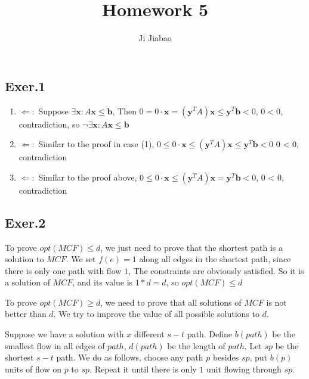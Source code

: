 \documentclass[UTF8]{ctexart}
\begin{document}
 

\title{Homework 5}
\author{Ji Jiabao}
\maketitle

\subsection*{Exer.1}
    \begin{enumerate}
        \item 
            $\Leftarrow:$ 
            Suppose $\exists \mathbf{x} : A\mathbf{x}\le\mathbf{b}$,
            Then $0 = 0 \cdot \mathbf{x}=(\mathbf{y}^TA)\mathbf{x} \le \mathbf{y}^T\mathbf{b} < 0$,
            $0 < 0$, contradiction, so $\neg \exists \mathbf{x} : A\mathbf{x}\le\mathbf{b}$
        \item 
            $\Leftarrow:$
            Similar to the proof in case (1), $0 \le 0 \cdot \mathbf{x} \le (\mathbf{y}^TA)\mathbf{x} \le \mathbf{y}^T\mathbf{b} < 0$
            0 < 0, contradiction
        \item 
            $\Leftarrow:$
            Similar to the proof above, $0 \le 0 \cdot \mathbf{x} \le (\mathbf{y}^TA)\mathbf{x} = \mathbf{y}^T\mathbf{b} < 0$,
            0 < 0, contradiction
    \end{enumerate}

\subsection*{Exer.2}
    To prove $opt(MCF) \le d$, we just need to prove that the shortest path is a solution to $MCF$.
    We set $f(e) = 1$ along all edges in the shortest path, since there is only one path with flow $1$,
    The constraints are obviously satisfied. So it is a solution of $MCF$, and its value is $1 * d = d$,
    so $opt(MCF) \le d$

    To prove $opt(MCF) \ge d$, we need to prove that all solutions of $MCF$ is not better than $d$.
    We try to improve the value of all possible solutions to $d$.
    
    Suppose we have a solution with $x$ different $s-t$ path. Define $b(path)$ be the smallest flow in all
    edges of $path$, $d(path)$ be the length of $path$. Let $sp$ be the shortest $s-t$ path. We do as follows, choose any path $p$ besides $sp$,
    put $b(p)$ units of flow on $p$ to $sp$. Repeat it until there is only $1$ unit flowing through $sp$.
\end{document}
